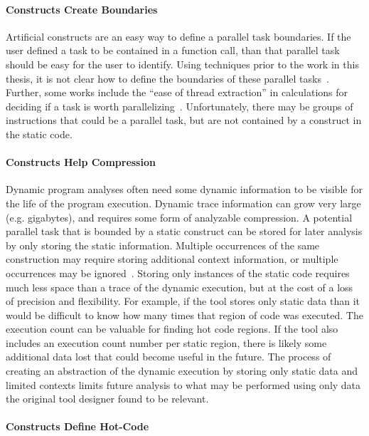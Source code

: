 \documentclass[defaultstyle,11pt]{thesis}
\begin{document}
\noindent\paragraph{Constructs Create Boundaries}

Artificial constructs are an easy way to define a parallel task
boundaries.  If the user defined a task to be contained in a function
call, than that parallel task should be easy for the user to identify.
Using techniques prior to the work in this thesis, it is not clear how
to define the boundaries of these parallel
tasks~\cite{jeon:2011:hotpar, garcia:2011:pldi}.  Further, some works
include the ``ease of thread extraction'' in calculations for deciding
if a task is worth parallelizing~\cite{garcia:2011:pldi}.
Unfortunately, there may be groups of instructions that could be a
parallel task, but are not contained by a construct in the static
code.

\noindent\paragraph{Constructs Help Compression}

Dynamic program analyses often need some dynamic information to be
visible for the life of the program execution.  Dynamic trace
information can grow very large (e.g. gigabytes), and requires some
form of analyzable compression.  A potential parallel task that is
bounded by a static construct can be stored for later analysis by only
storing the static information. Multiple occurrences of the same
construction may require storing additional context information, or
multiple occurrences may be ignored~\cite{minjang:10:micro,
  jeon:2011:hotpar, garcia:2011:pldi}.  Storing only instances of the
static code requires much less space than a trace of the dynamic
execution, but at the cost of a loss of precision and flexibility.
For example, if the tool stores only static data than it would be
difficult to know how many times that region of code was executed. The
execution count can be valuable for finding hot code regions.  If the
tool also includes an execution count number per static region, there
is likely some additional data lost that could become useful in the
future.  The process of creating an abstraction of the dynamic
execution by storing only static data and limited contexts limits
future analysis to what may be performed using only data the original
tool designer found to be relevant.

\noindent\paragraph{Constructs Define Hot-Code}
\end{document}
